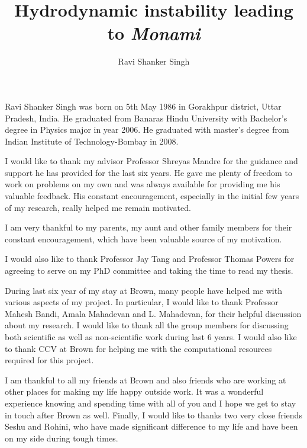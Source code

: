 \documentclass[12pt]{report}   %
\title{
Hydrodynamic instability leading to \textit{Monami}
}
\author{Ravi Shanker Singh}
\begin{document}
\doublespacing
\begin{preliminaries}
\maketitle

\copyrightpage

\begin{signature}
\end{signature}

\begin{vita}
  Ravi Shanker Singh was born on 5th May 1986 in Gorakhpur district, Uttar Pradesh, India. He graduated from Banaras Hindu University with Bachelor's degree in Physics major in year 2006. He graduated with master's degree from Indian Institute of Technology-Bombay in 2008.
\end{vita}

\begin{acknowledgments}
 I would like to thank my advisor Professor Shreyas Mandre for the guidance and
support he has provided for the last six years. He gave me plenty of freedom to work on problems on my own and was always available for 
providing me his valuable feedback. His constant encouragement,
especially in the initial few years of my research, really helped me remain motivated.

I am very thankful to my parents, my aunt and other family members for their constant encouragement, which have been valuable source of my motivation.

I would also like to thank Professor Jay Tang and Professor Thomas Powers for agreeing to serve on my
PhD committee and taking the time to read my thesis.


During last six year of my stay at Brown, many people have helped me with various aspects of my project. In particular, I would like to thank Professor Mahesh Bandi, Amala Mahadevan and L. Mahadevan, for their helpful discussion about my research. I would like to thank all the group members for discussing both scientific as well as non-scientific work during last 6 years. I would also like to thank CCV at Brown for helping me with the computational resources required for this project.

I am thankful to all my friends at Brown and also friends who are working at other places for making my life happy outside work. It was a
wonderful experience knowing and spending time with all of you and I hope we get to stay in touch
after Brown as well. Finally, I would like to thanks two very close friends Seshu and Rohini, who have made significant difference to my life and have been on my side during tough times.


\end{acknowledgments}
\end{preliminaries}
\end{document}
